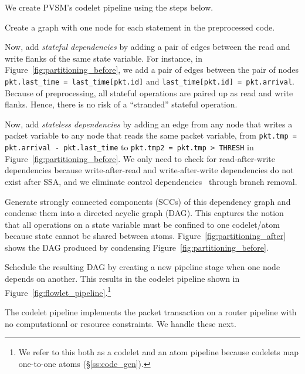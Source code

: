 We create PVSM's codelet pipeline using the steps below.
\begin{CompactEnumerate}
  \item Create a graph with one node for each statement in the preprocessed code.
  \item Now, add {\em stateful dependencies} by adding a pair of edges between
the read and write flanks of the same state variable. For instance, in
Figure~\ref{fig:partitioning_before}, we add a pair of edges between the pair
of nodes {\tt pkt.last\_time = last\_time[pkt.id]} and {\tt last\_time[pkt.id]
= pkt.arrival}. Because of preprocessing, all stateful operations are paired up
as read and write flanks.  Hence, there is no risk of a ``stranded'' stateful
operation.
  \item Now, add {\em stateless dependencies} by adding an edge from any node
    that writes a packet variable to any node that reads the same packet variable,
    \eg from {\tt pkt.tmp = pkt.arrival - pkt.last\_time} to {\tt pkt.tmp2 =
    pkt.tmp > THRESH} in Figure~\ref{fig:partitioning_before}. We only need to check
    for read-after-write dependencies because
    write-after-read and write-after-write dependencies do not exist after SSA, and
    we eliminate control dependencies~\cite{ssa} through branch removal.
  \item Generate strongly connected components (SCCs) of this dependency graph
    and condense them into a directed acyclic graph (DAG). This captures the notion that all
    operations on a state variable must be confined to one codelet/atom because
    state cannot be shared between atoms. Figure~\ref{fig:partitioning_after}
    shows the DAG produced by condensing Figure~\ref{fig:partitioning_before}.
  \item Schedule the resulting DAG by creating a new pipeline stage when one
    node depends on another. This results in the codelet pipeline
    shown in Figure~\ref{fig:flowlet_pipeline}.\footnote{We refer to this both
    as a codelet and an atom pipeline because codelets map one-to-one atoms
  (\S\ref{ss:code_gen}).}
\end{CompactEnumerate}
The codelet pipeline implements the packet transaction on a router pipeline
with no computational or resource constraints. We handle these next.

